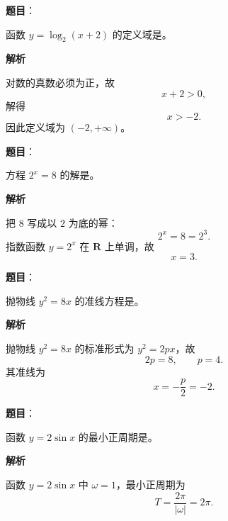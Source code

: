 

\begin{answer}

\textbf{题目}：

函数 $y=\log_2(x+2)$ 的定义域是\gkblank{}。

\textbf{解析}

对数的真数必须为正，故
\nopagebreak[4]
\[x+2>0,\]
解得
\nopagebreak[4]
\[x>-2.\]
因此定义域为 $(-2,+\infty)$。


\end{answer}
\begin{answer}

\textbf{题目}：

方程 $2^x=8$ 的解是\gkblank{}。

\textbf{解析}

把 $8$ 写成以 $2$ 为底的幂：
\nopagebreak[4]
\[2^x=8=2^3.\]
指数函数 $y=2^x$ 在 $\mathbf R$ 上单调，故
\nopagebreak[4]
\[x=3.\]


\end{answer}
\begin{answer}

\textbf{题目}：

抛物线 $y^2=8x$ 的准线方程是\gkblank{}。

\textbf{解析}

抛物线 $y^2=8x$ 的标准形式为 $y^2=2px$，故
\nopagebreak[4]
\[2p=8,\qquad p=4.\]
其准线为
\nopagebreak[4]
\[x=-\frac p2=-2.\]


\end{answer}
\begin{answer}

\textbf{题目}：

函数 $y=2\sin x$ 的最小正周期是\gkblank{}。

\textbf{解析}

函数 $y=2\sin x$ 中 $\omega=1$，最小正周期为
\nopagebreak[4]
\[T=\frac{2\pi}{|\omega|}=2\pi.\]


\end{answer}
